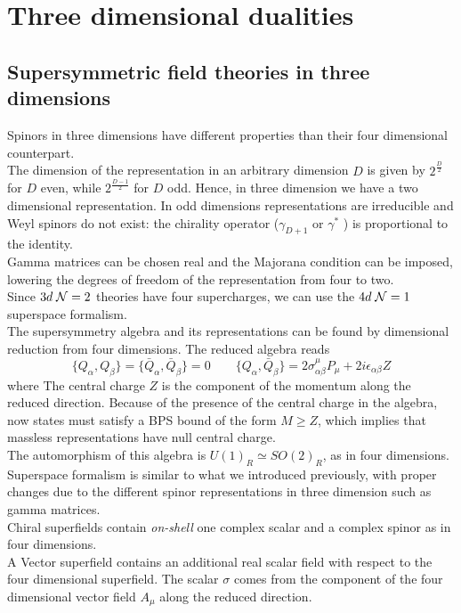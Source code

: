 

\chapter{Three dimensional dualities}
\section{Supersymmetric field theories in three dimensions}
Spinors in three dimensions have different properties than their four dimensional counterpart.\\
The dimension of the representation in an arbitrary dimension $D$  is given by $2^{\frac{D}{2}} $
for $D$ even, while $2^{\frac{D-1}{2}} $ for $D$ odd.
Hence, in three dimension we have a two dimensional representation.
In odd dimensions representations are irreducible and Weyl spinors do not exist: the chirality operator ($\gamma_{D+1}$ or $\gamma^*$ ) is proportional to the identity.
\\
Gamma matrices can be chosen real and the Majorana condition can be imposed, lowering the degrees of freedom of the representation from four to two.\\
Since $3d \; \mathcal{N}=2$ theories have four supercharges, we can use the $4d \; \mathcal{N}=1$ superspace formalism. 
\\
The supersymmetry algebra and its representations can be found by dimensional reduction from four dimensions. 
The reduced algebra reads
\begin{equation}
 \{ Q_{\alpha},Q_{\beta} \} =  \{ \bar{Q}_{\alpha},\bar{Q}_{\beta} \}= 0 \qquad \{ Q_{\alpha} , \bar{Q}_{\beta}   \} = 2 \sigma^{\mu}_{\alpha \beta} P_{\mu} + 2 i \epsilon_{\alpha \beta} Z
 \end{equation} 
 where 
The central charge $Z$ is the component of the momentum  along the reduced direction.
Because of the presence of the central charge in the algebra, now states must satisfy a BPS bound of the form $M \geq Z $, which implies that massless representations have null central charge.
\\
The automorphism of this algebra is $U(1)_R \simeq SO(2)_R$, as in four dimensions.
\\
Superspace formalism is similar to what we introduced previously, with proper changes due to the different spinor representations in three dimension such as gamma matrices.
\\
Chiral superfields contain \emph{on-shell} one complex scalar and a complex spinor as in four dimensions.\\
A Vector superfield contains an additional real scalar field with respect to the four dimensional superfield.
The scalar $\sigma $ comes from the component of the four dimensional vector field $A_{\mu}$ along the reduced direction.









